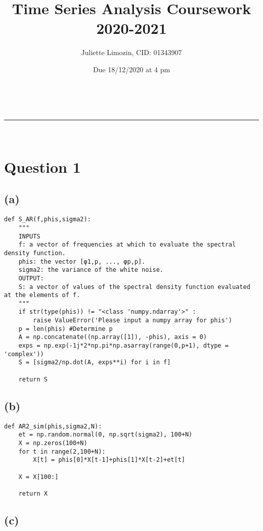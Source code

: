 \documentclass[a4paper,11pt]{article}
\makeatletter
\newcommand{\linia}{\rule{\linewidth}{0.5pt}}
\theoremstyle{mytheor}
\renewcommand{\maketitle}{
\begin{center}
\vspace{2ex}
{\huge \textsc{\@title}}
\vspace{1ex}
\\
\linia\\
\@author \hfill \@date
\vspace{1ex}
\end{center}
}
\makeatother
\begin{document}
\title{Time Series Analysis Coursework 2020-2021}

\author{Juliette Limozin, CID: 01343907}

\date{Due 18/12/2020 at 4 pm}

\maketitle

\section*{Question 1}
\subsection*{(a)}

\begin{lstlisting}
def S_AR(f,phis,sigma2):
    """
    INPUTS
    f: a vector of frequencies at which to evaluate the spectral density function.
    phis: the vector [φ1,p, ..., φp,p].
    sigma2: the variance of the white noise.
    OUTPUT:
    S: a vector of values of the spectral density function evaluated at the elements of f.
    """
    if str(type(phis)) != "<class 'numpy.ndarray'>" :
        raise ValueError('Please input a numpy array for phis')
    p = len(phis) #Determine p
    A = np.concatenate((np.array([1]), -phis), axis = 0)
    exps = np.exp(-1j*2*np.pi*np.asarray(range(0,p+1), dtype = 'complex'))
    S = [sigma2/np.dot(A, exps**i) for i in f]
    
    return S
\end{lstlisting}
\subsection*{(b)}

\begin{lstlisting}
def AR2_sim(phis,sigma2,N):
    et = np.random.normal(0, np.sqrt(sigma2), 100+N)
    X = np.zeros(100+N)
    for t in range(2,100+N):
        X[t] = phis[0]*X[t-1]+phis[1]*X[t-2]+et[t]
    
    X = X[100:]
    
    return X
\end{lstlisting}

\subsection*{(c)}

\newpage
\end{document}
